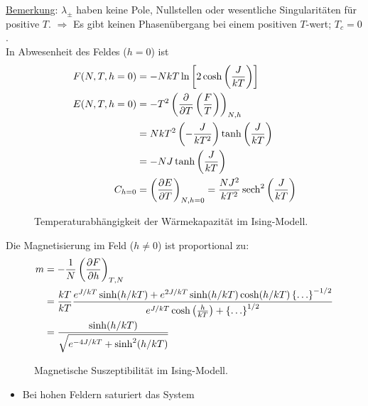 \begin{enumerate}[A)]
    \underline{Bemerkung}: $\lambda_\pm$ haben keine Pole, Nullstellen oder wesentliche Singularitäten für positive $T$.
    $\Rightarrow$ Es gibt keinen Phasenübergang bei einem positiven $T$-wert; $T_c = 0$. \\
    In Abwesenheit des Feldes ($h=0$) ist
    \begin{equation}
        \begin{split}
            F(N, T, h=0) &= - N k T \ln \left[ 2 \cosh \left( \frac{J}{k T} \right) \right] \\
            E(N, T, h=0) &= - T^2 \left( \frac{\partial}{\partial T} \left( \frac{F}{T} \right)  \right)_{N, h} \\
            &= N k T^2 \left( - \frac{J}{k T^2} \right) \tanh \left( \frac{J}{k T} \right)  \\
            &= - N J \tanh \left( \frac{J}{k T} \right) \\
            C_{h=0} &= \left( \frac{\partial E}{\partial T} \right)_{N, h=0} = \frac{N J^2}{k T^2} \operatorname{sech}^2 \left( \frac{J}{k T} \right)
        \end{split}
    \end{equation}
    \begin{figure}[H]
        \centering
        \def\svgwidth{0.5\textwidth}
        
        \caption{Temperaturabhängigkeit der Wärmekapazität im Ising-Modell.}
        \label{img:IsingC_T}
    \end{figure}
    Die Magnetisierung im Feld ($h \neq 0$) ist proportional zu:
    \begin{equation}
        \begin{split}
            m &= - \frac{1}{N} \left( \frac{\partial F}{\partial h} \right)_{T, N} \\
            &= \frac{k T}{k T} \frac{e^{J/kT} \sinh(h/kT) +e^{2J/kT} \sinh (h/kT) \cosh (h/kT) \left\{ \ldots \right\}^{-1/2}}{e^{J / k T} \cosh \left( \frac{h}{k T} \right) + \left\{ \ldots \right\}^{1/2}} \\
            &= \frac{\sinh (h / k T)}{\sqrt{e^{-4 J / k T} + \sinh^2 (h/k T)}}
        \end{split}
    \end{equation}
    \begin{figure}[H]
        \centering
        \def\svgwidth{0.6\textwidth}
        
        \caption{Magnetische Suszeptibilität im Ising-Modell.}
        \label{img:Isingm_T}
    \end{figure}
    \begin{itemize}
        \item Bei hohen Feldern saturiert das System

\end{itemize}
\end{enumerate}
